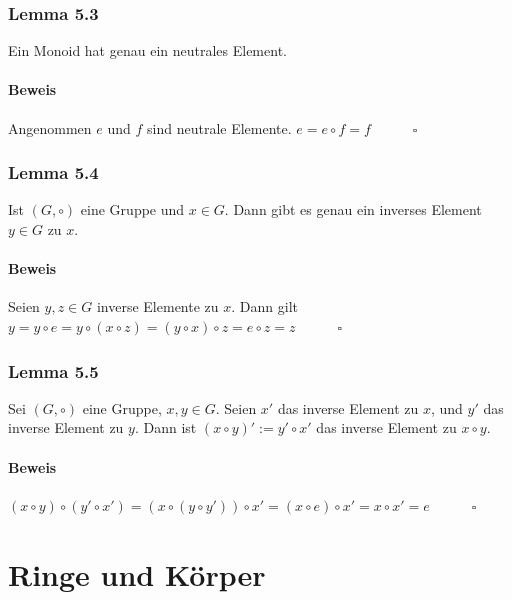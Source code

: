 \documentclass[a5paper, 10pt]{book}
\begin{document}
			\subsubsection{Lemma 5.3}
				Ein Monoid hat genau ein neutrales Element.
				\paragraph{Beweis} Angenommen $e$ und $f$ sind neutrale Elemente. $e = e\circ f = f\hspace{3em} \square$
				
			\subsubsection{Lemma 5.4}
				Ist $(G,\circ)$ eine Gruppe und $x \in G$. Dann gibt es genau ein inverses Element $y\in G$ zu $x$.
				\paragraph{Beweis} Seien $y,z\in G$ inverse Elemente zu $x$. Dann gilt\\
				$y = y\circ e = y \circ (x \circ z) = (y\circ x) \circ z = e \circ z = z \hspace{3em} \square$
				
			\subsubsection{Lemma 5.5}
				Sei $(G, \circ)$ eine Gruppe, $x,y\in G$. Seien $x'$ das inverse Element zu $x$, und $y'$ das inverse Element zu $y$. Dann ist $(x\circ y)' := y' \circ x'$ das inverse Element zu $x \circ y$.
				\paragraph{Beweis} $(x\circ y)\circ(y'\circ x') = (x\circ (y\circ y')) \circ x' = (x \circ e) \circ x' = x \circ x' = e \hspace{3em} \square$
				
		\section{Ringe und Körper}
			
\end{document}

